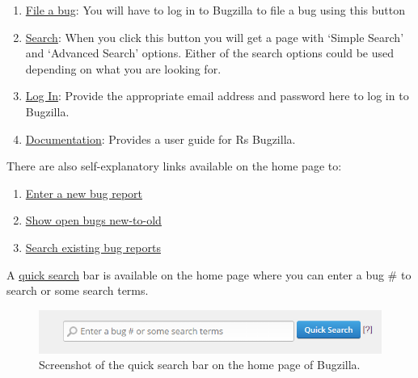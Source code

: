 \documentclass[
]{book}
\begin{document}
\begin{enumerate}
\def\labelenumi{\arabic{enumi}.}
\item
  \href{https://bugs.r-project.org/enter_bug.cgi}{File a bug}: You will have to log in to Bugzilla to file a bug using this button
\item
  \href{https://bugs.r-project.org/query.cgi}{Search}: When you click this button you will get a page with `Simple Search' and `Advanced Search' options. Either of the search options could be used depending on what you are looking for.
\item
  \href{https://bugs.r-project.org/?GoAheadAndLogIn=1}{Log In}: Provide the appropriate email address and password here to log in to Bugzilla.
\item
  \href{https://bugzilla.readthedocs.io/en/latest/using/index.html}{Documentation}: Provides a user guide for R\textquotesingle s Bugzilla.
\end{enumerate}

There are also self-explanatory links available on the home page to:

\begin{enumerate}
\def\labelenumi{\arabic{enumi}.}
\item
  \href{https://bugs.r-project.org/enter_bug.cgi}{Enter a new bug report}
\item
  \href{https://bugs.r-project.org/buglist.cgi?bug_file_loc_type=allwordssubstr\&bug_status=NEW\&bug_status=ASSIGNED\&bug_status=CONFIRMED\&bug_status=REOPENED\&bug_status=UNCONFIRMED\&bugidtype=include\&chfieldto=Now\&cmdtype=doit\&emailassigned_to1=1\&emailassigned_to2=1\&emailcc2=1\&emailreporter2=1\&emailtype1=substring\&emailtype2=substring\&field0-0-0=noop\&long_desc_type=substring\&order=bugs.delta_ts\%20desc\&query_format=advanced\&short_desc_type=allwordssubstr\&type0-0-0=noop}{Show open bugs new-to-old}
\item
  \href{https://bugs.r-project.org/query.cgi}{Search existing bug reports}
\end{enumerate}

A \href{https://bugs.r-project.org/page.cgi?id=quicksearch.html}{quick search} bar is available on the home page where you can enter a bug \# to search or some search terms.

\begin{figure}
\centering
\includegraphics{img/quicksearch.png}
\caption{Screenshot of the quick search bar on the home page of Bugzilla.}
\end{figure}
\end{document}
